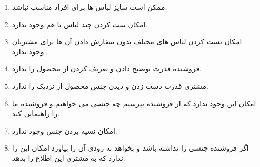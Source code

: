 \documentclass[12pt,a4paper]{article}
\begin{document}
\begin{enumerate}
	

\item
ممکن است سایز لباس ها برای افراد مناسب نباشد.
\item
امکان ست کردن چند لباس با هم وجود ندارد.
\item
امکان تست کردن لباس های مختلف بدون سفارش دادن آن ها برای مشتریان وجود ندارد.
\item
فروشنده قدرت توضیح دادن و تعریف کردن از محصول را ندارد.
\item
مشتری قدرت دست زدن و دیدن جنس محصول از نزدیک را ندارد.
\item
امکان این وجود ندارد که از فروشنده بپرسیم چه جنسی می خواهیم و فروشنده ما را راهنمایی کند.
\item
امکان نسیه بردن جنس وجود ندارد.
\item
اگر فروشنده جنسی را نداشته باشد و بخواهد به زودی آن را بیاورد امکان این را ندارد که به مشتری این اطلاع را بدهد.
	
\end{enumerate}	
\end{document}
